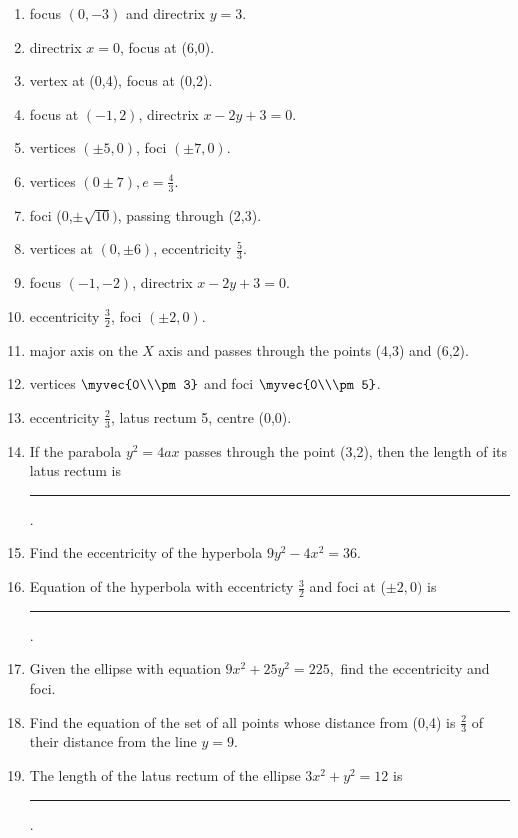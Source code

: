 \begin{enumerate}[label=\thesubsection.\arabic*,ref=\thesubsection.\theenumi,resume*]
\\
\solution

\item focus $(0,-3)$ and directrix $y=3$.
\item  directrix $x=0$, focus at (6,0).
\item  vertex  at (0,4), focus at (0,2).
\item  focus at $(-1,2)$, directrix $x-2y+3=0$.
	 \item  vertices $(\pm5,0)$, foci $(\pm 7,0)$.
	 \item vertices $(0\pm7), e =\frac{4}{3}$. 
	 \item  foci (0,$\pm\sqrt{10})$, passing through (2,3).
\item vertices at $(0,\pm6)$,  eccentricity $\frac{5}{3}$.
\item focus $(-1,-2)$,  directrix $x-2y+3=0$.
\item eccentricity $\frac{3}{2}$, foci $(\pm2,0)$.
\item major axis on the $X$ axis and passes through the points (4,3) and (6,2).
\\
\solution

\item vertices $\myvec{0\\\pm 3}$ and foci $\myvec{0\\\pm5}$.
	\\
\solution
		
 \item eccentricity $\frac{2}{3}$, latus rectum 5, centre  (0,0).
\item If the parabola $y^2=4ax$ passes through the point (3,2), then the length of its latus rectum is \rule{1cm}{0.1pt}.
\item Find the eccentricity of the hyperbola $9y^2-4x^2=36$.
\item Equation of the hyperbola with eccentricty $\frac{3}{2}$ and foci at ($\pm2,0)$ is \rule{1cm}{0.1pt}.
 \item Given the ellipse with equation $9x^2+25y^2=225,$ find the eccentricity and foci.
 \item Find the equation of the set of all points whose distance from (0,4) is $\frac{2}{3}$ of their distance from the line $y=9$.
\item The length of the latus rectum of the ellipse $3x^2+y^2=12$ is \rule{1cm}{0.1pt}.
\end{enumerate}
